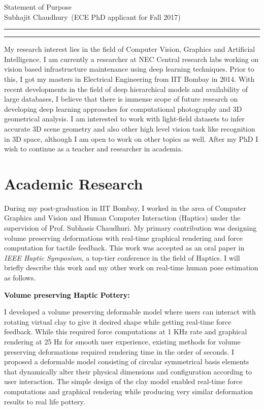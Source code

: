 \documentclass{article}
\newcommand{\soptitle}{Statement of Purpose}
\newcommand{\yourname}{Subhajit Chaudhury}
\newcommand{\statement}[1]{\par\medskip
	{\textcolor{black}{\textbf{#1:}}}\space
}
\begin{document}
	
	\begin{center}\LARGE\soptitle\\
	\large \yourname\ (ECE PhD applicant for Fall 2017)
	\end{center}
	
	\hrule
	\hrule height 1pt
	
	\bigskip
	
	My research interest lies in the field of Computer Vision, Graphics and Artificial Intelligence. I am currently a researcher at NEC Central research labs working on vision based infrastructure maintenance using deep learning techniques. Prior to this, I got my masters in Electrical Engineering from IIT Bombay in 2014. With recent developments in the field of deep hierarchical models and availability of large databases, I believe that there is immense scope of future research on developing deep learning approaches for computational photography and 3D geometrical analysis. I am interested to work with light-field datasets to infer accurate 3D scene geometry and also other high level vision task like recognition in 3D space, although I am open to work on other topics as well. After my PhD I wish to continue as a teacher and researcher in academia.
	
	\vspace*{-0.25cm}
	\section{Academic Research}
		\vspace*{-0.25cm}
	During my post-graduation in IIT Bombay, I worked in the area of Computer Graphics and Vision and Human Computer Interaction (Haptics) under the supervision of Prof. Subhasis Chaudhuri. My primary contribution was designing volume preserving deformations with real-time graphical rendering and force computation for tactile feedback. This work was accepted as an oral paper in\textit{ IEEE Haptic Symposium}, a top-tier conference in the field of Haptics. I will briefly describe this work and my other work on real-time human pose estimation as follows.
	
	\statement{Volume preserving Haptic Pottery}
	I developed a volume preserving deformable model where users can interact with rotating virtual clay to give it desired shape while getting real-time force feedback. While this required force computations at 1 KHz rate and graphical rendering at 25 Hz for smooth user experience, existing methods for volume preserving deformations required rendering time in the order of seconds. I proposed a deformable model consisting of circular symmetrical basis elements that dynamically alter their physical dimensions and configuration according to user interaction. The simple design of the clay model enabled real-time force computations and graphical rendering while producing very similar deformation results to real life pottery.
	
\end{document}
